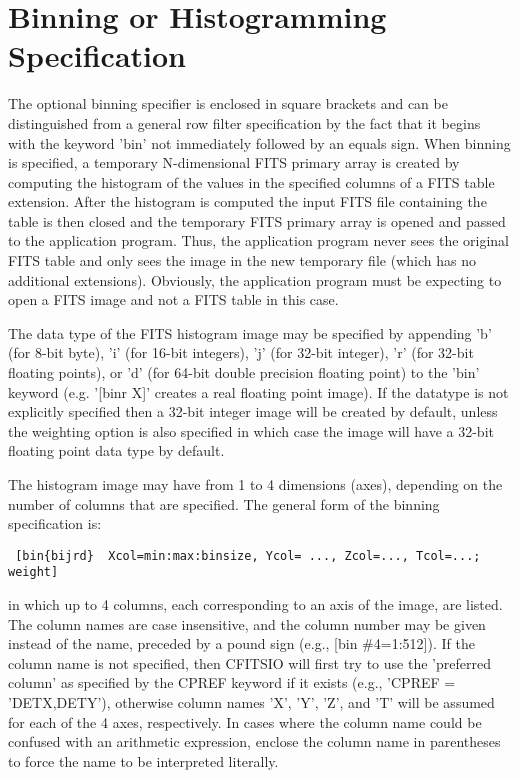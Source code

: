\documentclass[11pt]{book}
\begin{document}
\section{ Binning or Histogramming Specification}

The optional binning specifier is enclosed in square brackets and can
be distinguished from a general row filter specification by the fact
that it begins with the keyword 'bin'  not immediately followed by an
equals sign.  When binning is specified, a temporary N-dimensional FITS
primary array is created by computing the histogram of the values in
the specified columns of a FITS table extension.  After the histogram
is computed the input FITS file containing the table is then closed and
the temporary FITS primary array is opened and passed to the
application program.  Thus, the application program never sees the
original FITS table and only sees the image in the new temporary file
(which has no additional extensions).  Obviously, the application
program must be expecting to open a FITS image and not a FITS table in
this case.

The data type of the FITS histogram image may be specified by appending
'b' (for 8-bit byte), 'i' (for 16-bit integers), 'j' (for 32-bit
integer), 'r' (for 32-bit floating points), or 'd' (for 64-bit double
precision floating point)  to the 'bin' keyword (e.g. '[binr X]'
creates a real floating point image).  If the datatype is not
explicitly specified then a 32-bit integer image will be created by
default, unless the weighting option is also specified in which case
the image will have a 32-bit floating point data type by default.

The histogram image may have from 1 to 4 dimensions (axes), depending
on the number of columns that are specified.  The general form of the
binning specification is:

\begin{verbatim}
 [bin{bijrd}  Xcol=min:max:binsize, Ycol= ..., Zcol=..., Tcol=...; weight]
\end{verbatim}
in which up to 4 columns, each corresponding to an axis of the image,
are listed. The column names are case insensitive, and the column
number may be given instead of the name, preceded by a pound sign
(e.g., [bin \#4=1:512]).  If the column name is not specified, then
CFITSIO will first try to use the 'preferred column' as specified by
the CPREF keyword if it exists (e.g., 'CPREF = 'DETX,DETY'), otherwise
column names 'X', 'Y', 'Z', and 'T' will be assumed for each of the 4
axes, respectively.  In cases where the column name could be confused
with an arithmetic expression, enclose the column name in parentheses to
force the name to be interpreted literally.
\end{document}
